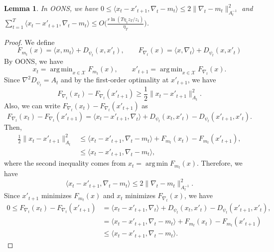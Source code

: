 \documentclass{article}
\theoremstyle{plain}
\newtheorem{lemma}[theorem]{Lemma}
\theoremstyle{definition}
\theoremstyle{remark}
\DeclareMathOperator*{\argmin}{arg\,min}
\newcommand{\cX}{\mathcal{X}}
\newcommand{\oons}{{\sc OONS}}
\begin{document}
\begin{lemma}\label{lem:term1}
In \oons, we have 
$0\leq\langle x_{t}-x'_{t+1},\nabla_t-m_t\rangle \leq 2\|\nabla_t-m_t\|_{A_t^{-1}}^2$ and $\sum_{t=1}^T\langle x_{t}-x'_{t+1},\nabla_t-m_t\rangle\leq O\Big(\frac{r\ln(T\eta_1 z_T/z_1)}{\eta_T}\Big)$.
\end{lemma}
\begin{proof}
We define 
\begin{equation*}
F_{m_t}(x)=\langle x,m_t\rangle+D_{\psi_t}(x,x'_t), \qquad F_{\nabla_t}(x)=\langle x,\nabla_t\rangle+D_{\psi_t}(x,x'_t)
\end{equation*}
By \oons, we have
\begin{equation*}
x_t=\argmin_{x\in\cX} F_{m_t}(x), \qquad x'_{t+1}=\argmin_{x\in\cX} F_{\nabla_t}(x).
\end{equation*}
Since $\nabla^2 D_{\psi_t}=A_t$ and by the first-order optimality at $x'_{t+1}$, we have
\begin{equation*}
F_{\nabla_t}(x_t)-F_{\nabla_t}(x'_{t+1})\geq \frac{1}{2}\|x_t-x'_{t+1}\|^2_{A_t}.
\end{equation*}
Also, we can write $F_{\nabla_t}(x_t)-F_{\nabla_t}(x'_{t+1})$ as
\begin{equation*}
F_{\nabla_t}(x_t)-F_{\nabla_t}(x'_{t+1})=\langle x_t-x'_{t+1},\nabla_t\rangle+D_{\psi_t}(x_t,x'_t)-D_{\psi_t}(x'_{t+1},x'_t).
\end{equation*}
Then,
\begin{align*}
\frac{1}{2}\|x_t-x'_{t+1}\|^2_{A_t}&\leq \langle x_t-x'_{t+1},\nabla_t-m_t\rangle+F_{m_t}(x_t)-F_{m_t}(x'_{t+1}),\\
&\leq \langle x_t-x'_{t+1},\nabla_t-m_t\rangle,
\end{align*}
where the second inequality comes from $x_t=\argmin F_{m_t}(x)$.
Therefore, we have
\begin{equation*}\label{eq:part1_1}
\langle x_{t}-x'_{t+1},\nabla_t-m_t\rangle \leq 2\|\nabla_t-m_t\|_{A_t^{-1}}^2.
\end{equation*}
Since $x'_{t+1}$ minimizes $F_{m_t}(x)$ and $x_{t}$ minimizes $F_{\nabla_t}(x)$, we have
\begin{align*}
0\leq F_{\nabla_t}(x_t)-F_{\nabla_t}(x'_{t+1})&=\langle x_t-x'_{t+1},\nabla_t\rangle+D_{\psi_t}(x_t,x'_t)-D_{\psi_t}(x'_{t+1},x'_t),\\
&=\langle x_t-x'_{t+1},\nabla_t-m_t\rangle+F_{m_t}(x_t)-F_{m_t}(x'_{t+1})\\
&\leq \langle x_t-x'_{t+1},\nabla_t-m_t\rangle.
\end{align*}


\end{proof}
\end{document}
